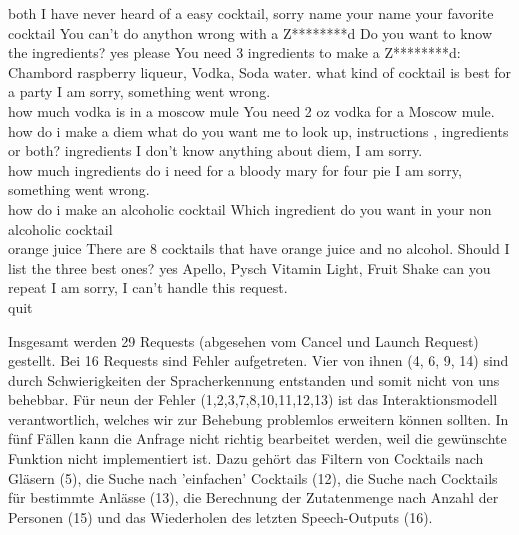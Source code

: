 \documentclass[12pt,letterpaper]{article}
\begin{document}
\begin{dialogue}
	 both
	 I have never heard of a easy cocktail, sorry 
	 name your name your favorite cocktail
	 You can't do anython wrong with a Z********d Do you want to know the ingredients?
	 yes please
	 You need 3 ingredients to make a Z********d: Chambord raspberry liqueur, Vodka, Soda water.
	 what kind of cocktail is best for a party
	 I am sorry, something went wrong. \\
	 how much vodka is in a moscow mule
	 You need 2 oz vodka for a Moscow mule.
	 how do i make a diem
	 what do you want me to look up, instructions , ingredients or both?
	 ingredients
	 I don't know anything about diem, I am sorry. \\
	 how much ingredients do i need for a bloody mary for four pie
	 I am sorry, something went wrong. \\
	 how do i make an alcoholic cocktail
	 Which ingredient do you want in your non alcoholic cocktail \\
	 orange juice
	 There are 8 cocktails that have orange juice and no alcohol. Should I list the three best ones?
	 yes
	 Apello, Pysch Vitamin Light, Fruit Shake
	 can you repeat
	 I am sorry, I can't handle this request. \\
	 quit
\end{dialogue}

Insgesamt werden 29 Requests (abgesehen vom Cancel und Launch Request) gestellt. Bei 16 Requests sind Fehler aufgetreten. Vier von ihnen (4, 6, 9, 14) sind durch Schwierigkeiten der Spracherkennung entstanden und somit nicht von uns behebbar. Für neun der Fehler (1,2,3,7,8,10,11,12,13) ist das Interaktionsmodell verantwortlich, welches wir zur Behebung problemlos erweitern können sollten. In fünf Fällen kann die Anfrage nicht richtig bearbeitet werden, weil die gewünschte Funktion nicht implementiert ist. Dazu gehört das Filtern von Cocktails nach Gläsern (5), die Suche nach 'einfachen' Cocktails (12), die Suche nach Cocktails für bestimmte Anlässe (13), die Berechnung der Zutatenmenge nach Anzahl der Personen (15) und das Wiederholen des letzten Speech-Outputs (16).
\end{document}
